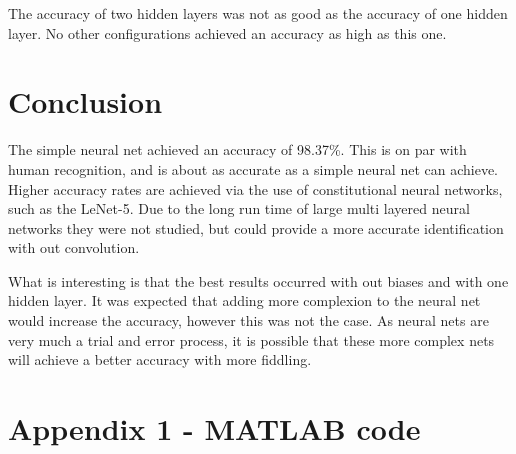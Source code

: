 \documentclass[12pt]{article}
\begin{document}
	The accuracy of two hidden layers was not as good as the accuracy of one hidden layer. No other configurations achieved an accuracy as high as this one. 

	
	\section{Conclusion}
	
	The simple neural net achieved an accuracy of 98.37\%. This is on par with human recognition, and is about as accurate as a simple neural net can achieve. Higher accuracy rates are achieved via the use of constitutional neural networks, such as the  LeNet-5\cite{len5en}. Due to the long run time of large multi layered neural networks they were not studied, but could provide a more accurate identification with out convolution.\par 
	
	What is interesting is that the best results occurred with out biases and with one hidden layer. It was expected that adding more complexion to the neural net would increase the accuracy, however this was not the case. As neural nets are very much a trial and error process, it is possible that these more complex nets will achieve a better accuracy with more fiddling. 

		
		
		

		
		\singlespacing
		\section*{Appendix 1 - MATLAB code}
		
\end{document}
